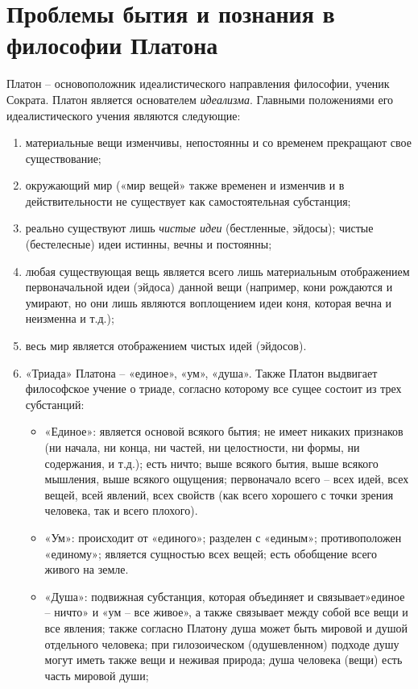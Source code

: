 \documentclass[12pt]{article}
\begin{document}
\section{Проблемы бытия и познания в философии Платона}
Платон – основоположник идеалистического направления философии, ученик Сократа.
Платон является основателем \textit{идеализма}.
Главными положениями его идеалистического учения являются следующие:
\begin{enumerate}
\item материальные вещи изменчивы, непостоянны и со временем прекращают свое существование;
\item окружающий мир («мир вещей» также временен и изменчив и в действительности не существует как
	самостоятельная субстанция;
\item реально существуют лишь \textit{чистые идеи} (бестленные, эйдосы);
	чистые (бестелесные) идеи истинны, вечны и постоянны;
\item любая существующая вещь является всего лишь материальным отображением первоначальной идеи (эйдоса)
	данной вещи (например, кони рождаются и умирают, но они лишь являются воплощением идеи коня, которая
	вечна и неизменна и т.д.);
\item весь мир является отображением чистых идей (эйдосов).
\item «Триада» Платона – «единое», «ум», «душа».
	Также Платон выдвигает философское учение о триаде, согласно которому все сущее состоит из трех
	субстанций:
	\begin{itemize}
	\item «Единое»:
		является основой всякого бытия;
		не имеет никаких признаков (ни начала, ни конца, ни частей, ни целостности, ни формы, ни содержания, и т.д.);
		есть ничто;
		выше всякого бытия, выше всякого мышления, выше всякого ощущения;
		первоначало всего – всех идей, всех вещей, всей явлений, всех свойств (как всего хорошего с точки зрения
		человека, так и всего плохого).
	\item «Ум»:
		происходит от «единого»; разделен с «единым»; противоположен «единому»; является сущностью всех вещей;
		есть обобщение всего живого на земле.
	\item «Душа»:
		подвижная субстанция, которая объединяет и связывает»единое – ничто» и «ум – все живое», а также связывает
		между собой все вещи и все явления; также согласно Платону душа может быть мировой и душой отдельного
		человека; при гилозоическом (одушевленном) подходе душу могут иметь также вещи и неживая природа;
		душа человека (вещи) есть часть мировой души;

\end{itemize}
\end{enumerate}
\end{document}
